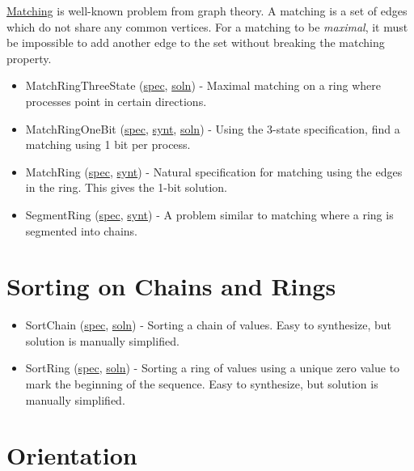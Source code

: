 \href{http://en.wikipedia.org/wiki/Matching_(graph_theory)}{Matching} is well-known problem from graph theory.
A matching is a set of edges which do not share any common vertices.
For a matching to be \textit{maximal}, it must be impossible to add another edge to the set without breaking the matching property.
\begin{itemize}
\item MatchRingThreeState (\href{examplespec/MatchRingThreeState.prot}{spec}, \href{examplesoln/MatchRingThreeState.prot}{soln})
- Maximal matching on a ring where processes point in certain directions.
\item MatchRingOneBit (\href{examplespec/MatchRingOneBit.prot}{spec}, \href{examplesynt/MatchRingOneBit.prot}{synt}, \href{examplesoln/MatchRingOneBit.prot}{soln})
- Using the 3-state specification, find a matching using 1 bit per process.
\item MatchRing (\href{examplespec/MatchRing.prot}{spec}, \href{examplesynt/MatchRing.prot}{synt})
- Natural specification for matching using the edges in the ring.
This gives the 1-bit solution.
\item SegmentRing (\href{examplespec/SegmentRing.prot}{spec}, \href{examplesynt/SegmentRing.prot}{synt})
- A problem similar to matching where a ring is segmented into chains.
\end{itemize}

\section{Sorting on Chains and Rings}

\begin{itemize}
\item SortChain (\href{examplespec/SortChain.prot}{spec}, \href{examplesoln/SortChain.prot}{soln})
- Sorting a chain of values.
Easy to synthesize, but solution is manually simplified.
\item SortRing (\href{examplespec/SortRing.prot}{spec}, \href{examplesoln/SortRing.prot}{soln})
- Sorting a ring of values using a unique zero value to mark the beginning of the sequence.
Easy to synthesize, but solution is manually simplified.
\end{itemize}

\section{Orientation}

